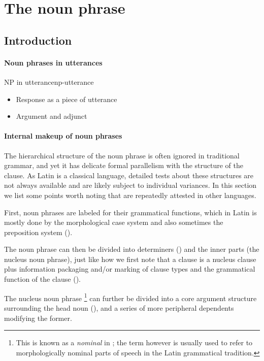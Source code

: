 \documentclass[a4paper, oneside, 12pt]{report}
\newcommand*{\term}[1]{\emph{#1}}
\begin{document}
\section{The noun phrase}\label{sec:grammatical.np}

\subsection{Introduction}

\paragraph*{Noun phrases in utterances}

\begin{todobox}{NP in utterance}{np-utterance}
    \begin{itemize}
        \item Response as a piece of utterance
        \item Argument and adjunct
    \end{itemize}
\end{todobox}

\paragraph*{Internal makeup of noun phrases}
The hierarchical structure of the noun phrase is often ignored in traditional grammar,
and yet it has delicate formal parallelism with the structure of the clause.
As Latin is a classical language,
detailed tests about these structures are not always available
and are likely subject to individual variances.
In this section we list some points worth noting that are repeatedly attested in other languages.

First, noun phrases are labeled for their grammatical functions,
which in Latin is mostly done by the morphological case system
and also sometimes the preposition system 
().

The noun phrase can then be divided into determiners
() and the inner parts (the nucleus noun phrase),
just like how we first note that a clause is a nucleus clause plus 
information packaging and/or marking of clause types and the grammatical function of the clause 
().

The nucleus noun phrase%
\footnote{
    This is known as a \term{nominal} in \citet{cgel};
    the term however is usually used to refer to morphologically nominal parts of speech in 
    the Latin grammatical tradition.
}
can further be divided into a core argument structure surrounding the head noun
(),
and a series of more peripheral dependents modifying the former.
\end{document}
